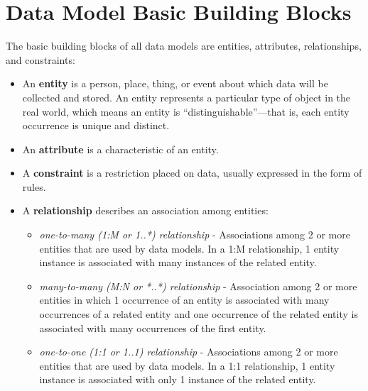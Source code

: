 \documentclass[a4paper, 12pt, titlepage]{report}
\begin{document}
\section{Data Model Basic Building Blocks}
The basic building blocks of all data models are entities, attributes, relationships, and constraints:
\begin{itemize}
\item An \textbf{entity} is a person, place, thing, or event about which data will be collected and stored. An entity represents a particular type of object in the real world, which means an entity is “distinguishable”—that is, each entity occurrence is unique and distinct.
\item An \textbf{attribute} is a characteristic of an entity.
\item A \textbf{constraint} is a restriction placed on data, usually expressed in the form of rules.
\item A \textbf{relationship} describes an association among entities:
\begin{itemize}
\item \emph{one-to-many (1:M or 1..*) relationship} - Associations among 2 or more entities that are used by data models. In a 1:M relationship, 1 entity instance is associated with many instances of the related entity.
\item \emph{many-to-many (M:N or *..*) relationship} - Association among 2 or more entities in which 1 occurrence of an entity is associated with many occurrences of a related entity and one occurrence of the related entity is associated with many occurrences of the first entity.
\item \emph{one-to-one (1:1 or 1..1) relationship} - Associations among 2 or more entities that are used by data models. In a 1:1 relationship, 1 entity instance is associated with only 1 instance of the related entity.
\end{itemize}
\end{itemize}
\end{document}
